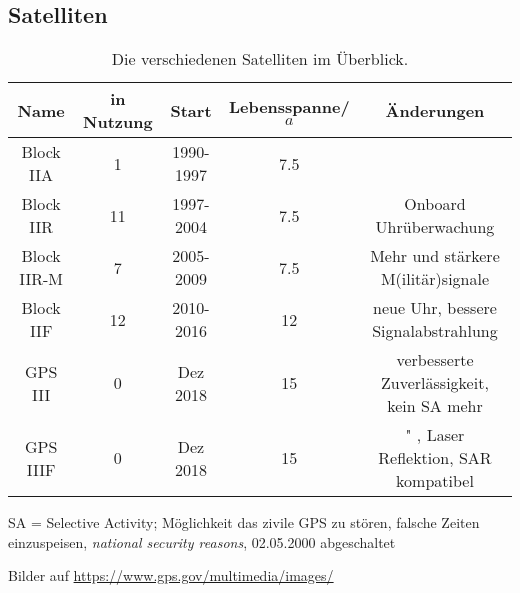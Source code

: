 \subsection{Satelliten}
\begin{table}
    \caption{Die verschiedenen Satelliten im Überblick.}
    \label{tab:satelliten}
    \begin{tabular}{c S[table-format=2.0] c S[table-format=2.1] c}
        \toprule
        {Name} & {in Nutzung} & {Start} & {Lebensspanne\;/\;$a$} & {Änderungen} \\
        \midrule
        Block IIA   &  1 & 1990-1997 & 7.5 & \\
        Block IIR   & 11 & 1997-2004 & 7.5 & Onboard Uhrüberwachung \\
        Block IIR-M &  7 & 2005-2009 & 7.5 & Mehr und stärkere M(ilitär)signale \\
        Block IIF   & 12 & 2010-2016 & 12  & neue Uhr, bessere Signalabstrahlung \\
        GPS III     &  0 & Dez 2018  & 15  & verbesserte Zuverlässigkeit, kein SA mehr \\
        GPS IIIF    &  0 & Dez 2018  & 15  & " , Laser Reflektion, SAR kompatibel \\
        \bottomrule
    \end{tabular}
\end{table}
SA = Selective Activity; Möglichkeit das zivile GPS zu stören, falsche Zeiten einzuspeisen, \textit{national security reasons}, 02.05.2000 abgeschaltet

Bilder auf \url{https://www.gps.gov/multimedia/images/}
